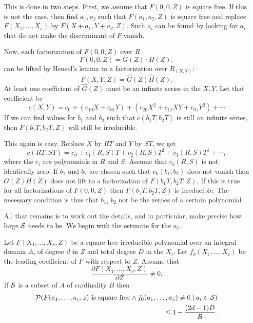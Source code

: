 This is done in two steps. First, we assume that $F(0, 0, Z)$ is
square free.  If this is not the case, then find $a_1, a_2$ such that
$F(a_1, a_2, Z)$ is square free and replace $F(X_1, \ldots, X_v)$ by
$F(X + a_1, Y + a_2, Z)$.  Such $a_i$ can be found by looking for
$a_i$ that do not make the discriminant of $F$ vanish.

Now, each factorization  of $F(0, 0, Z)$ over $R$
\[
F(0, 0, Z) = G(Z) \cdot H(Z),
\]
can be lifted by Hensel's lemma to a factorization over $R_{(X,Y)}$:
\[
F(X, Y, Z) = \hat{G}(Z) \hat{H}(Z).
\]
At least one coefficient of $\hat{G}(Z)$ must be an infinite series in
the $X, Y$.  Let that coefficient be 
\[
c(X, Y) = c_0 + (c_{10} X + c_{01} Y) + 
(c_{20} X^2 + c_{11} XY + c_{01} Y^2) + \cdots
\]
If we can find values for $b_1$ and $b_2$ such that $c(b_1 T, b_2 T)$ is
still an infinite series, then $F(b_1 T, b_2 T, Z)$ will still be
irreducible.  

This again is easy.  Replace $X$ by $R T$ and $Y$ by $S T$, we get
\[
c(RT, S T) = c_0 + c_1(R, S) T + c_2(R, S) T^2 + c_3(R, S) T^3 + \cdots,
\]
where the $c_i$ are polynomials in $R$ and $S$.  Assume that $c_k(R,
S)$ is not identically zero.  If $b_1$ and $b_2$ are chosen such that
$c_k(b_1, b_2)$ does not vanish then $G(Z) H(Z)$ does not lift to a
factorization of $F(b_1T, b_2T, Z)$.  If this is true for all
factorizations of $F(0, 0, Z)$ then $F(b_1T, b_2T, Z)$ is irreducible.
The necessary condition is thus that $b_1$, $b_2$ not be the zeroes of
a certain polynomial.

All that remains is to work out the details, and in particular, make
precise how large ${\cal S}$ needs to be.  We begin with the estimate
for the $a_i$.


\begin{proposition} \label{SquareFree:HIT:Prop}
Let $F(X_1, \ldots, X_v, Z)$ be a square free irreducible polynomial
over an integral domain $A$, of degree $d$ in $Z$ and total degree $D$
in the $X_i$.  Let $f_0(X_1, \ldots, X_v)$ be the leading coefficient
of $F$ with respect to $Z$.  Assume that
\[
\frac{\partial F(X_1, \ldots, X_v, Z)}{\partial Z} \not= 0.
\]
If ${\cal S}$ is a subset of $A$ of cardinality $B$
then 
\[
\begin{aligned}
{\cal P}(\mbox{$F(a_1, \ldots, a_v, z)$ is square free} 
\wedge f_0(a_1, \ldots, a_v) \not= 0\mid a_i \in {\cal S}) \\
\qquad \le 1 -\frac{(2d - 1)D}{B}.
\end{aligned}
\]
\end{proposition}

